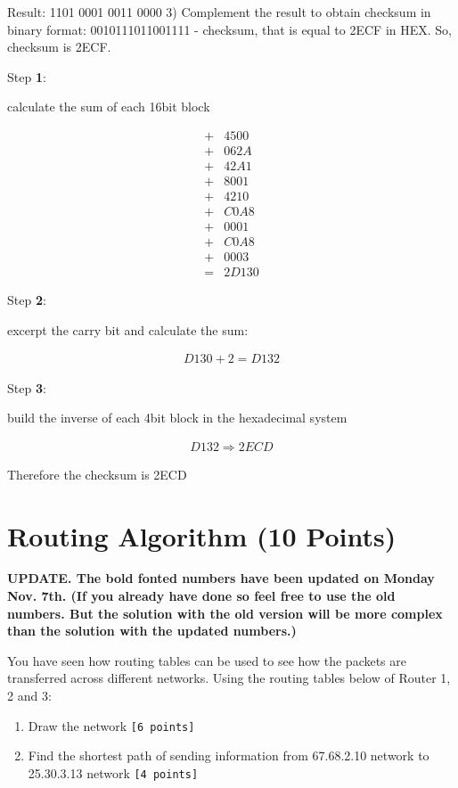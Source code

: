 \documentclass{WeSTassignment}
\begin{document}
Result: 1101 0001 0011 0000
3) Complement the result to obtain checksum in binary format:
0010111011001111 - checksum, that is equal to 2ECF in HEX.
So, checksum is 2ECF.
\fi

Step \textbf{1}:

calculate the sum of each 16bit block

\begin{align*}
+ &  4500  \\
+ &  062A \\
+ &  42A1 \\
+ &  8001 \\
+ &  4210 \\
+ &  C0A8 \\
+ &  0001 \\
+ &  C0A8 \\
+ &  0003 \\
= & 2D130
\end{align*}

Step \textbf{2}:

excerpt the carry bit and calculate the sum:

\begin{align*}
D130 + 2 = D132
\end{align*}

Step \textbf{3}:

build the inverse of each 4bit block in the hexadecimal system

\begin{align*}
D132 \Rightarrow 2ECD
\end{align*}

Therefore the checksum is 2ECD



\section{Routing Algorithm (10 Points)}
\textbf{UPDATE. The bold fonted numbers have been updated on Monday Nov. 7th. (If you already have done so feel free to use the old numbers. But the solution with the old version will be more complex than the solution with the updated numbers.)}

You have seen how routing tables can be used to see how the packets are transferred across different networks. Using the routing tables below of Router 1, 2 and 3:
\begin{enumerate}
\item Draw the network \texttt{[6 points]}
\item Find the shortest path of sending information from 67.68.2.10 network to 25.30.3.13 network \texttt{[4 points]}
\end{enumerate}
\end{document}
